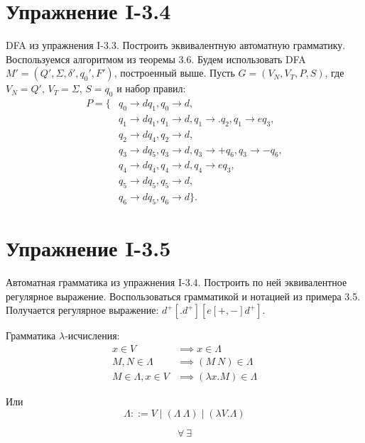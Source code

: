 \documentclass[12pt, oneside]{memoir}
\begin{document}
\section*{Упражнение I-3.4}
\begin{solution}
    {DFA из упражнения I-3.3.}
    {Построить эквивалентную автоматную грамматику.}
    {Воспользуемся алгоритмом из теоремы 3.6.}
    Будем использовать DFA $M' = (Q', \Sigma, \delta', q_0', F')$, построенный выше.
    Пусть $G = (V_N, V_T, P, S)$, где $V_N = Q'$, $V_T = \Sigma$, $S = q_0$ и набор правил:
    \begin{align*}
        P = \{ & q_0 \to d q_1, q_0 \to d,                               \\
               & q_1 \to d q_1, q_1 \to d, q_1 \to . q_2, q_1 \to e q_3, \\
               & q_2 \to d q_4, q_2 \to d,                               \\
               & q_3 \to d q_5, q_3 \to d, q_3 \to + q_6, q_3 \to - q_6, \\
               & q_4 \to d q_4, q_4 \to d, q_4 \to e q_3,                \\
               & q_5 \to d q_5, q_5 \to d,                               \\
               & q_6 \to d q_5, q_6 \to d\}.
    \end{align*}
\end{solution}

\section*{Упражнение I-3.5}
\begin{solution}
    {Автоматная грамматика из упражнения I-3.4.}
    {Построить по ней эквивалентное регулярное выражение.}
    {Воспользоваться грамматикой и нотацией из примера 3.5.}
    Получается регулярное выражение: $d^+[.d^+][e[+,-]d^+]$.
\end{solution}


\newpage
Грамматика $\lambda$-исчисления:
\begin{align*}
    x \in V                & \implies x \in \Lambda             \\
    M, N \in \Lambda       & \implies (M\ N) \in \Lambda        \\
    M \in \Lambda, x \in V & \implies (\lambda x.M) \in \Lambda
\end{align*}

Или
\[\Lambda ::= V \mid (\Lambda\ \Lambda) \mid (\lambda V.\Lambda)\]

\[\forall \ \exists\]
\end{document}
